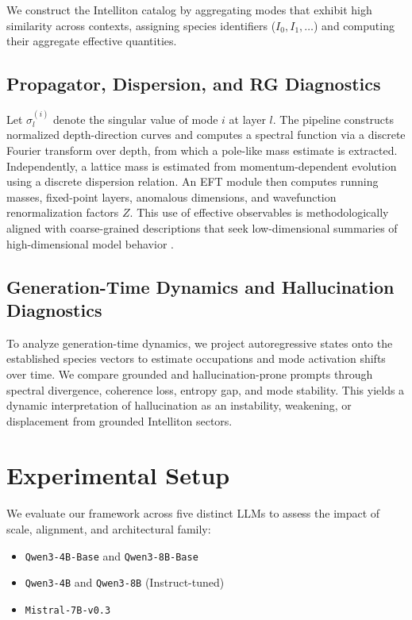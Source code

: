 \documentclass[11pt]{article}
\begin{document}
We construct the Intelliton catalog by aggregating modes that exhibit high similarity across contexts, assigning species identifiers ($I_0, I_1, \dots$) and computing their aggregate effective quantities.

\subsection{Propagator, Dispersion, and RG Diagnostics}
Let $\sigma_l^{(i)}$ denote the singular value of mode $i$ at layer $l$. The pipeline constructs normalized depth-direction curves and computes a spectral function via a discrete Fourier transform over depth, from which a pole-like mass estimate is extracted. Independently, a lattice mass is estimated from momentum-dependent evolution using a discrete dispersion relation. An EFT module then computes running masses, fixed-point layers, anomalous dimensions, and wavefunction renormalization factors $Z$. This use of effective observables is methodologically aligned with coarse-grained descriptions that seek low-dimensional summaries of high-dimensional model behavior \citep{raju2026modelerrors}.

\subsection{Generation-Time Dynamics and Hallucination Diagnostics}
To analyze generation-time dynamics, we project autoregressive states onto the established species vectors to estimate occupations and mode activation shifts over time. We compare grounded and hallucination-prone prompts through spectral divergence, coherence loss, entropy gap, and mode stability. This yields a dynamic interpretation of hallucination as an instability, weakening, or displacement from grounded Intelliton sectors.

\section{Experimental Setup}
We evaluate our framework across five distinct LLMs to assess the impact of scale, alignment, and architectural family:
\begin{itemize}[leftmargin=1.5em]
    \item \texttt{Qwen3-4B-Base} and \texttt{Qwen3-8B-Base}
    \item \texttt{Qwen3-4B} and \texttt{Qwen3-8B} (Instruct-tuned)
    \item \texttt{Mistral-7B-v0.3}
\end{itemize}
\end{document}
